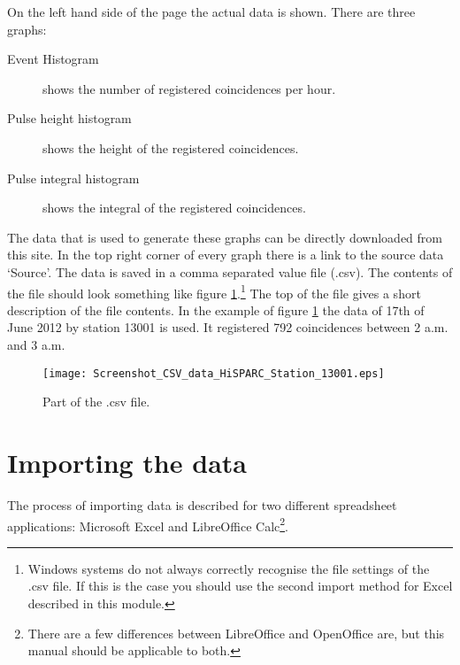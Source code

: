 On the left hand side of the page the actual data is shown. There are three graphs:
\begin{description}
\item[Event Histogram] shows the number of registered coincidences per hour.
\item[Pulse height histogram] shows the height of the registered coincidences.
\item[Pulse integral histogram] shows the integral of the registered coincidences.
\end{description}

The data that is used to generate these graphs can be directly downloaded from this site. In the top right corner of every graph there is a link to the source data `Source'. The data is saved in a comma separated value file (.csv). The contents of the file should look something like figure \ref{fig:data_CSV}.\footnote{Windows systems do not always correctly recognise the file settings of the .csv file. If this is the case you should use the second import method for Excel described in this module.} The top of the file gives a short description of the file contents. In the example of figure \ref{fig:data_CSV} the data of 17th of June 2012 by station 13001 is used. It registered 792 coincidences between 2 a.m. and 3 a.m.

\begin{figure}\begin{center}
\texttt{[image: Screenshot\_CSV\_data\_HiSPARC\_Station\_13001.eps]}
\caption{Part of the .csv file.}\label{fig:data_CSV}
\end{center}\end{figure} 

\section{Importing the data}
The process of importing data is described for two different spreadsheet applications: Microsoft Excel and LibreOffice Calc\footnote{There are a few differences between LibreOffice and OpenOffice are, but this manual should be applicable to both.}.

